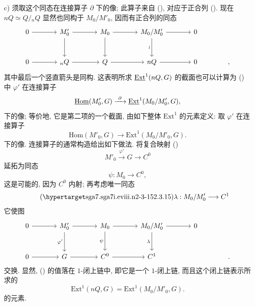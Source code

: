 \medskip
\noindent c) 须取这个同态在连接算子 $\partial$ 下的像; 此算子来自 (), 对应于正合列 (). 现在 $nQ\simeq Q/{}_nQ$ 显然也同构于 $M_0/M'_0$, 因而有正合列的同态
\[
\begin{tikzcd}[column sep=large,row sep=large]
 0\arrow[r]&M'_0\arrow[r]\arrow[d]&M_0\arrow[r]\arrow[d]
   &M_0/M'_0\arrow[r]\arrow[d,"\wr"']&0\\
 0\arrow[r]&{}_nQ\arrow[r]&Q\arrow[r]&nQ\arrow[r]&0&{,}
\end{tikzcd}
\]
其中最后一个竖直箭头是同构. 这表明所求 $\uExt^1(nQ,G)$ 的截面也可以计算为 () 中 $\varphi'$ 在连接算子
\[
 \uHom(M'_0,G)\xrightarrow{\ \partial\ }
 \uExt^1(M_0/M'_0,G),
\]
下的像; 等价地, 它是第二项的一个截面, 由如下整体 $\mathrm{Ext}^1$ 的元素定义: 取 $\varphi'$ 在连接算子
\[
 \mathrm{Hom}(M'_0,G)\longrightarrow
 \mathrm{Ext}^1(M_0/M'_0,G).
\]
下的像. 连接算子的通常构造给出如下做法. 将复合映射 ()
\[
 M'_0\xrightarrow{\ \varphi'\ }G\longrightarrow C^0
\]
延拓为同态
\[
 \psi:M_0\longrightarrow C^0,
\]
这是可能的, 因为 $C^0$ 内射; 再考虑唯一同态
\begin{equation}\tag{\SGARefTarget{sga7.sga7i.eviii.n2-3-15}{2.3.15}}
 \lambda:M_0/M'_0\longrightarrow C^1
\end{equation}
它使图
\[
\begin{tikzcd}[column sep=large,row sep=large]
 0\arrow[r]&M'_0\arrow[r]\arrow[d,"\varphi'"']
   &M_0\arrow[r]\arrow[d,"\psi"']
   &M_0/M'_0\arrow[r]\arrow[d,"\lambda"']&0\\
 0\arrow[r]&G\arrow[r]&C^0\arrow[r]&C^1&&{.}
\end{tikzcd}
\]
交换. 显然, () 的值落在 $1$-闭上链中, 即它是一个 $1$-闭上链, 而且这个闭上链表示所求的
\[
 \mathrm{Ext}^1(nQ,G)=\mathrm{Ext}^1(M_0/M'_0,G).
\]
的元素.


